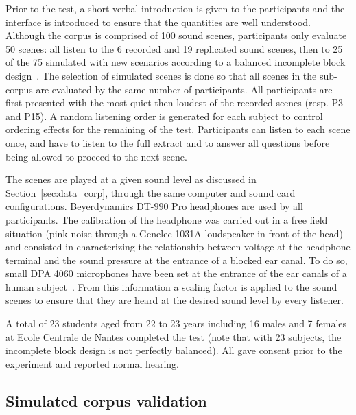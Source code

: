 \documentclass[twocolumn]{article}
\begin{document}
Prior to the test, a short verbal introduction is given to the participants and the interface is introduced to ensure that the quantities are well understood. Although the corpus is comprised of 100 sound scenes, participants only evaluate 50 scenes: all listen to the 6 recorded and 19 replicated sound scenes, then to 25 of the 75 simulated with new scenarios according to a balanced incomplete block design~\cite{dagnelie2003}. The selection of simulated scenes is done so that all scenes in the sub-corpus are evaluated by the same number of participants. All participants are first presented with the most quiet then loudest of the recorded scenes (resp. P3 and P15). A random listening order is generated for each subject to control ordering effects for the remaining of the test. Participants can listen to each scene once, and have to listen to the full extract and to answer all questions before being allowed to proceed to the next scene.

The scenes are played at a given sound level as discussed in Section~\ref{sec:data_corp}, through the same computer and sound card configurations. Beyerdynamics DT-990 Pro headphones are used by all participants. The calibration of the headphone was carried out in a free field situation (pink noise through a Genelec 1031A loudspeaker in front of the head) and consisted in characterizing the relationship between voltage at the headphone terminal and the sound pressure at the entrance of a blocked ear canal. To do so, small DPA 4060 microphones have been set at the entrance of the ear canals of a human subject~\cite{moller1992}. From this information a scaling factor is applied to the sound scenes to ensure that they are heard at the desired sound level by every listener.

A total of 23 students aged from 22 to 23 years including 16 males and 7 females at Ecole Centrale de Nantes completed the test (note that with 23 subjects, the incomplete block design is not perfectly balanced). All gave consent prior to the experiment and reported normal hearing.


\subsection{Simulated corpus validation}
\label{sec:data_val}
\end{document}
